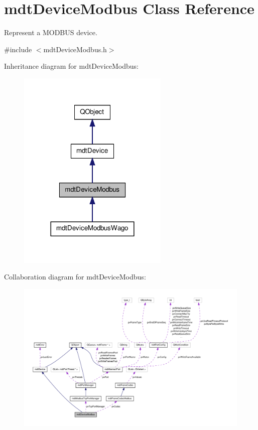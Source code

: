 \hypertarget{classmdt_device_modbus}{\section{mdt\-Device\-Modbus Class Reference}
\label{classmdt_device_modbus}
}


Represent a M\-O\-D\-B\-U\-S device.  




{\ttfamily \#include $<$mdt\-Device\-Modbus.\-h$>$}



Inheritance diagram for mdt\-Device\-Modbus\-:\nopagebreak
\begin{figure}[H]
\begin{center}
\leavevmode
\includegraphics[width=204pt]{classmdt_device_modbus__inherit__graph}
\end{center}
\end{figure}


Collaboration diagram for mdt\-Device\-Modbus\-:
\nopagebreak
\begin{figure}[H]
\begin{center}
\leavevmode
\includegraphics[width=350pt]{classmdt_device_modbus__coll__graph}
\end{center}
\end{figure}
